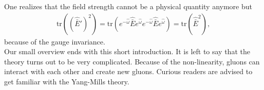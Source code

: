 One realizes that the field strength cannot be a physical quantity anymore but 
\begin{align}
\text{tr} ( (\hat{\bar{E}}')^2 ) = \text{tr} ( e^{- \hat{\omega}} \hat{\bar{E}} e^{\hat{\omega}} e^{- \hat{\omega}} \hat{\bar{E}} e^{\hat{\omega}} ) = \text{tr} ( \hat{\bar{E}}^2 ),
\end{align}
because of the gauge invariance. \\

Our small overview ends with this short introduction. It is left to say that the theory turns out to be very complicated. Because of the non-linearity, gluons can interact with each other and create new gluons. Curious readers are advised to get familiar with the Yang-Mills theory.